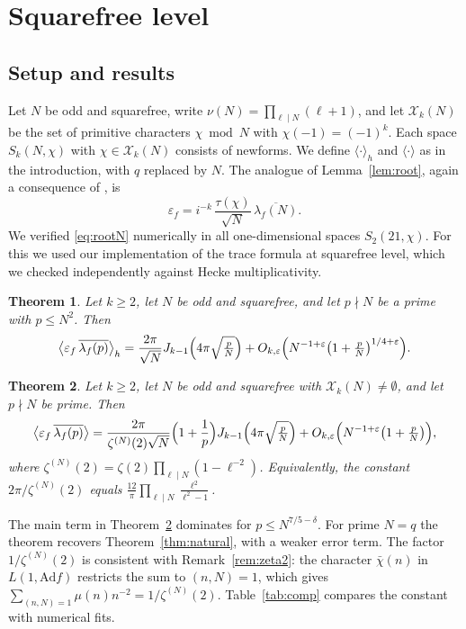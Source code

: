 \documentclass[11pt]{amsart}
\newtheorem{theorem}{Theorem}
\theoremstyle{remark}
\newcommand{\eps}{\varepsilon}
\newcommand{\cX}{\mathcal{X}}
\newcommand{\ov}{\overline}
\begin{document}
\section{Squarefree level}\label{sec:composite}

\subsection{Setup and results}
Let $N$ be odd and squarefree, write $\nu(N)=\prod_{\ell\mid N}(\ell+1)$, and let $\cX_k(N)$ be the set of primitive characters $\chi\bmod N$ with $\chi(-1)=(-1)^k$. Each space $S_k(N,\chi)$ with $\chi\in\cX_k(N)$ consists of newforms. We define $\langle\cdot\rangle_h$ and $\langle\cdot\rangle$ as in the introduction, with $q$ replaced by $N$. The analogue of Lemma~\ref{lem:root}, again a consequence of \cite{AL}, is
\begin{equation}\label{eq:rootN}
\eps_f=i^{-k}\,\frac{\tau(\chi)}{\sqrt N}\,\ov{\lambda_f(N)}.
\end{equation}
We verified \eqref{eq:rootN} numerically in all one-dimensional spaces $S_2(21,\chi)$. For this we used our implementation of the trace formula at squarefree level, which we checked independently against Hecke multiplicativity.

\begin{theorem}\label{thm:compositeh}
Let $k\ge2$, let $N$ be odd and squarefree, and let $p\nmid N$ be a prime with $p\le N^2$. Then
\[
\bigl\langle\eps_f\,\ov{\lambda_f(p)}\bigr\rangle_h=\frac{2\pi}{\sqrt N}J_{k-1}\Bigl(4\pi\sqrt{\tfrac pN}\Bigr)+O_{k,\varepsilon}\Bigl(N^{-1+\varepsilon}\bigl(1+\tfrac pN\bigr)^{1/4+\varepsilon}\Bigr).
\]
\end{theorem}

\begin{theorem}\label{thm:compositenat}
Let $k\ge2$, let $N$ be odd and squarefree with $\cX_k(N)\neq\emptyset$, and let $p\nmid N$ be prime. Then
\[
\bigl\langle\eps_f\,\ov{\lambda_f(p)}\bigr\rangle=\frac{2\pi}{\zeta^{(N)}(2)\sqrt N}\Bigl(1+\frac1p\Bigr)J_{k-1}\Bigl(4\pi\sqrt{\tfrac pN}\Bigr)+O_{k,\varepsilon}\Bigl(N^{-1+\varepsilon}\bigl(1+\tfrac pN\bigr)\Bigr),
\]
where $\zeta^{(N)}(2)=\zeta(2)\prod_{\ell\mid N}(1-\ell^{-2})$. Equivalently, the constant $2\pi/\zeta^{(N)}(2)$ equals $\frac{12}{\pi}\prod_{\ell\mid N}\frac{\ell^2}{\ell^2-1}$.
\end{theorem}

The main term in Theorem~\ref{thm:compositenat} dominates for $p\le N^{7/5-\delta}$. For prime $N=q$ the theorem recovers Theorem~\ref{thm:natural}, with a weaker error term. The factor $1/\zeta^{(N)}(2)$ is consistent with Remark~\ref{rem:zeta2}: the character $\bar\chi(n)$ in $L(1,\mathrm{Ad}f)$ restricts the sum to $(n,N)=1$, which gives $\sum_{(n,N)=1}\mu(n)n^{-2}=1/\zeta^{(N)}(2)$. Table~\ref{tab:comp} compares the constant with numerical fits.
\end{document}
